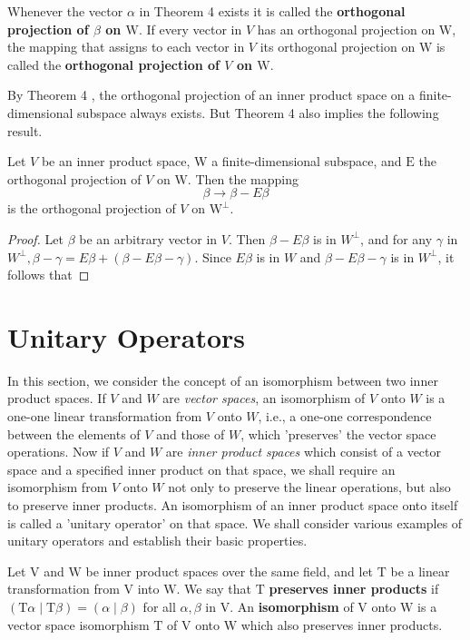 \documentclass[main.tex]{subfiles}
\begin{document}
\begin{definition}Whenever the vector $\alpha$ in Theorem 4 exists it is called the \textbf{orthogonal projection of $\beta$ on $\mathrm{W}$}. If every vector in $V$ has an orthogonal projection on $\mathrm{W}$, the mapping that assigns to each vector in $V$ its orthogonal projection on $\mathrm{W}$ is called the \textbf{orthogonal projection of $V$ on $\mathrm{W}$}.\end{definition}

By Theorem 4 , the orthogonal projection of an inner product space on a finite-dimensional subspace always exists. But Theorem 4 also implies the following result.

\begin{corollary}
    Let $V$ be an inner product space, W a finite-dimensional subspace, and $\mathrm{E}$ the orthogonal projection of $V$ on $\mathrm{W}$. Then the mapping
    $$
    \beta \rightarrow \beta-E \beta
    $$
    is the orthogonal projection of $V$ on $\mathrm{W}^{\perp}$.
\end{corollary}
\begin{proof}
    Let $\beta$ be an arbitrary vector in $V$. Then $\beta-E \beta$ is in $W^{\perp}$, and for any $\gamma$ in $W^{\perp}, \beta-\gamma=E \beta+(\beta-E \beta-\gamma)$. Since $E \beta$ is in $W$ and $\beta-E \beta-\gamma$ is in $W^{\perp}$, it follows that
\end{proof}

\section{Unitary Operators}
In this section, we consider the concept of an isomorphism between two inner product spaces. If $V$ and $W$ are \textit{vector spaces}, an isomorphism of $V$ onto $W$ is a one-one linear transformation from $V$ onto $W$, i.e., a one-one correspondence between the elements of $V$ and those of $W$, which 'preserves' the vector space operations. Now if $V$ and $W$ are \textit{inner product spaces} which consist of a vector space and a specified inner product on that space, we shall require an isomorphism from $V$ onto $W$ not only to preserve the linear operations, but also to preserve inner products. An isomorphism of an inner product space onto itself is called a 'unitary operator' on that space. We shall consider various examples of unitary operators and establish their basic properties.

\begin{definition}
Let $\mathrm{V}$ and $\mathrm{W}$ be inner product spaces over the same field, and let $\mathrm{T}$ be a linear transformation from $\mathrm{V}$ into $\mathrm{W}$. We say that $\mathrm{T}$ \textbf{preserves inner products} if $(\mathrm{T} \alpha \mid \mathrm{T} \beta)=(\alpha \mid \beta)$ for all $\alpha, \beta$ in $\mathrm{V}$. An \textbf{isomorphism} of $\mathrm{V}$ onto $\mathrm{W}$ is a vector space isomorphism $\mathrm{T}$ of $\mathrm{V}$ onto $\mathrm{W}$ which also preserves inner products. 
\end{definition}
\end{document}
